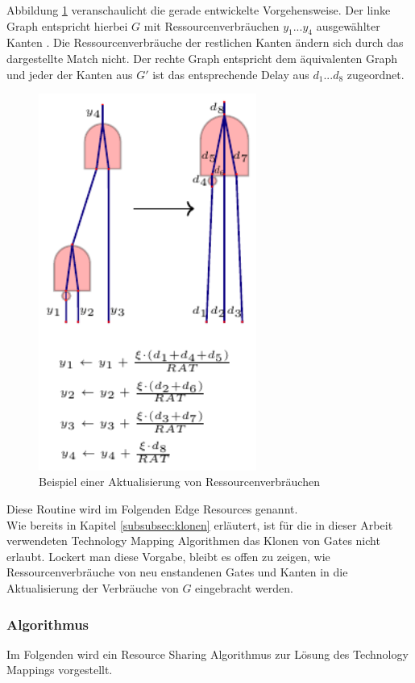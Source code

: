 \documentclass[11pt, a4paper, german]{article}
\newcommand{\TM}{Technology  Mapping }
\begin{document}
Abbildung \ref{bild:RS_new_y} veranschaulicht die gerade entwickelte Vorgehensweise. Der linke Graph entspricht hierbei $G$ mit Ressourcenverbräuchen $y_1 ... y_4$ ausgewählter Kanten . Die Ressourcenverbräuche der restlichen Kanten ändern sich durch das dargestellte Match nicht. Der rechte Graph entspricht dem äquivalenten Graph und jeder der Kanten aus $G'$ ist das entsprechende Delay aus $d_1... d_8$ zugeordnet.\\



\begin{figure}[h]
\begin{center}
 \includegraphics[height = 350pt]{./pictures/compiled/RS_new_y}
 \caption{Beispiel einer Aktualisierung von Ressourcenverbräuchen}
 \label{bild:RS_new_y}
\end{center}
\end{figure}

Diese Routine wird im Folgenden Edge Resources genannt.\\
Wie bereits in Kapitel \ref{subsubsec:klonen} erläutert, ist für die in dieser Arbeit verwendeten \TM Algorithmen das Klonen von Gates nicht erlaubt. Lockert man diese Vorgabe, bleibt es offen zu zeigen, wie Ressourcenverbräuche von neu enstandenen Gates und Kanten in die Aktualisierung der Verbräuche von $G$ eingebracht werden. \\


\subsubsection{Algorithmus}
Im Folgenden wird ein Resource Sharing Algorithmus zur Lösung des Technology Mappings vorgestellt. \\
\end{document}
